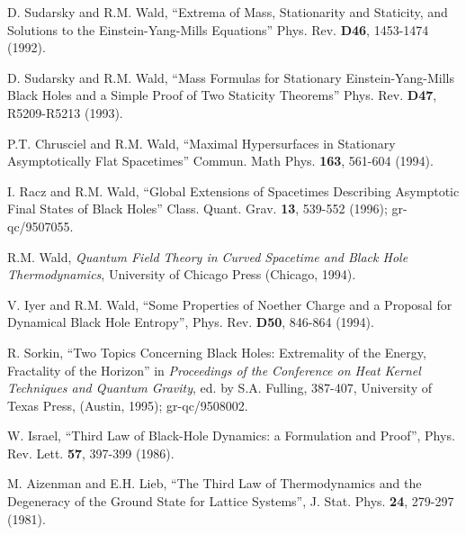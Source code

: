 \begin{thebibliography}{999}
 D. Sudarsky and R.M. Wald, ``Extrema of
Mass, Stationarity and Staticity, and Solutions to the
Einstein-Yang-Mills Equations'' Phys. Rev. {\bf D46}, 1453-1474
(1992).

 D. Sudarsky and R.M. Wald, ``Mass
Formulas for Stationary Einstein-Yang-Mills Black Holes and a Simple
Proof of Two Staticity Theorems'' Phys. Rev. {\bf D47}, R5209-R5213 (1993).

 P.T. Chrusciel and R.M. Wald, ``Maximal
Hypersurfaces in Stationary Asymptotically Flat Spacetimes''
Commun. Math Phys. {\bf 163}, 561-604 (1994).

 I. Racz and R.M. Wald, ``Global
Extensions of Spacetimes Describing Asymptotic Final States of Black
Holes'' Class. Quant. Grav. {\bf 13}, 539-552 (1996);  gr-qc/9507055.

 R.M. Wald, {\it Quantum Field Theory in
Curved Spacetime and Black Hole Thermodynamics}, University of Chicago
Press (Chicago, 1994).  

 V. Iyer and R.M. Wald, ``Some Properties
of Noether Charge and a Proposal for Dynamical Black Hole Entropy'',
Phys. Rev. {\bf D50}, 846-864 (1994).

 R. Sorkin, ``Two Topics Concerning
Black Holes: Extremality of the Energy, Fractality of the Horizon'' in
{\it Proceedings of the Conference on Heat Kernel Techniques and
Quantum Gravity}, ed. by S.A. Fulling, 387-407, University of Texas
Press, (Austin, 1995); gr-qc/9508002. 

 W. Israel, ``Third Law of Black-Hole
Dynamics: a Formulation and Proof'', Phys. Rev. Lett. {\bf 57},
397-399 (1986).  

 M. Aizenman and E.H. Lieb, ``The Third
Law of Thermodynamics and the Degeneracy of the Ground State for
Lattice Systems'', J. Stat. Phys.  {\bf 24}, 279-297 (1981).


\end{thebibliography}
